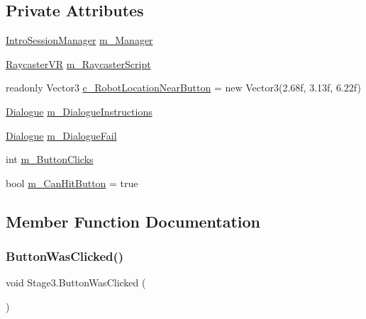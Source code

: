\subsection*{Private Attributes}
\begin{DoxyCompactItemize}
\item 
\mbox{\hyperlink{class_intro_session_manager}{Intro\+Session\+Manager}} \mbox{\hyperlink{class_stage3_a60a220a150389131070a070cc3347e05}{m\+\_\+\+Manager}}
\item 
\mbox{\hyperlink{class_v_r_standard_assets_1_1_utils_1_1_raycaster_v_r}{Raycaster\+VR}} \mbox{\hyperlink{class_stage3_a5c4d1688c502ea8bd4c753b2218c4007}{m\+\_\+\+Raycaster\+Script}}
\item 
readonly Vector3 \mbox{\hyperlink{class_stage3_a6a0ce3270dd4215a5cd38b3d5e81e723}{c\+\_\+\+Robot\+Location\+Near\+Button}} = new Vector3(2.\+68f, 3.\+13f, 6.\+22f)
\item 
\mbox{\hyperlink{class_dialogue}{Dialogue}} \mbox{\hyperlink{class_stage3_aab381d5b8a47d993bb82777b6792866f}{m\+\_\+\+Dialogue\+Instructions}}
\item 
\mbox{\hyperlink{class_dialogue}{Dialogue}} \mbox{\hyperlink{class_stage3_af1a5f4e00ee60f23f0d28fd02d671127}{m\+\_\+\+Dialogue\+Fail}}
\item 
int \mbox{\hyperlink{class_stage3_aeb53b781e0caf8b3eb317a5044514932}{m\+\_\+\+Button\+Clicks}}
\item 
bool \mbox{\hyperlink{class_stage3_a62ef9acb64218865668a01d54d8a3705}{m\+\_\+\+Can\+Hit\+Button}} = true
\end{DoxyCompactItemize}


\subsection{Member Function Documentation}
\mbox{\label{class_stage3_a5c1a079dcce9bb1d77bfe427d82d705c}} 
\subsubsection{\texorpdfstring{Button\+Was\+Clicked()}{ButtonWasClicked()}}
{\footnotesize\ttfamily void Stage3.\+Button\+Was\+Clicked (\begin{DoxyParamCaption}{ }\end{DoxyParamCaption})\hspace{0.3cm}{\ttfamily [private]}}



